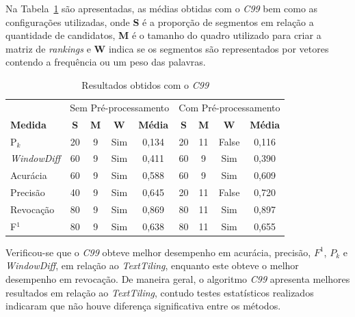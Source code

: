 Na Tabela~\ref{tab:resultadosc99} são apresentadas, as médias obtidas com o \textit{C99} bem como as configurações utilizadas, onde \textbf{S} é a proporção de segmentos em relação a quantidade de candidatos, \textbf{M} é o tamanho do quadro utilizado para criar a matriz de \textit{rankings} e \textbf{W} indica se os segmentos são representados por vetores contendo a frequência ou um peso das palavras.


\begin{table}[!h]
	\centering
	\begin{tabular}{|l||c|c|c|c||c|c|c|c|} \hline

		& \multicolumn{4}{c||}{Sem Pré-processamento} 
		& \multicolumn{4}{c|}{Com Pré-processamento}\\			

		\textbf{Medida} & 
		\textbf{S} & 
		\textbf{M} & 
		\textbf{W} & 
		\textbf{Média} &
		\textbf{S} & 
		\textbf{M} & 
		\textbf{W} & 
		\textbf{Média} \\	\hline

		P$_k$				& 20 & 9 & Sim & 0,134& 20 & 11 & False	& 0,116 \\ \hline  
		\textit{WindowDiff}	& 60 & 9 & Sim & 0,411& 60 &  9 & Sim 	& 0,390 \\ \hline  
		Acurácia			& 60 & 9 & Sim & 0,588& 60 &  9 & Sim 	& 0,609 \\ \hline  
		Precisão			& 40 & 9 & Sim & 0,645& 20 & 11 & False	& 0,720 \\ \hline  
		Revocação			& 80 & 9 & Sim & 0,869& 80 & 11 & Sim 	& 0,897 \\ \hline  
		F$^1$				& 80 & 9 & Sim & 0,638& 80 & 11 & Sim 	& 0,655 \\ \hline  

	\end{tabular}
	\caption{Resultados obtidos com o \textit{C99}}
	\label{tab:resultadosc99}
\end{table}



Verificou-se que o \textit{C99} obteve melhor desempenho em acurácia, precisão, $F^1$, $P_k$ e \textit{WindowDiff}, em relação ao \textit{TextTiling}, enquanto este obteve o melhor desempenho em revocação. De maneira geral, o algoritmo \textit{C99} apresenta melhores resultados em relação ao \textit{TextTiling}, contudo testes estatísticos realizados indicaram que não houve diferença significativa entre os métodos. 





